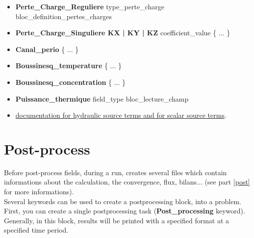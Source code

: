 \begin{itemize}
\item \textbf{Perte\_Charge\_Reguliere} type\_perte\_charge bloc\_definition\_pertes\_charges
\item \textbf{Perte\_Charge\_Singuliere KX | KY | KZ } coefficient\_value \{ ... \} 
\item \textbf{Canal\_perio} \{ ... \} 
\item \textbf{Boussinesq\_temperature} \{ ... \}
\item \textbf{Boussinesq\_concentration} \{ ... \}
\item \textbf{Puissance\_thermique} field\_type   bloc\_lecture\_champ 
\item \href{TRUST_Reference_Manual.pdf\#sourcebase}{documentation for hydraulic source terms and for scalar source terms}.
\end{itemize}





\section{Post-process}

Before post-process fields, during a run, \trust creates several files which contain informations about the calculation, the convergence, flux, bilans... (see part \ref{post} for more informations).\\

Several keywords can be used to create a postprocessing block, into a problem. First, you can create a single postprocessing task (\textbf{Post\_processing} keyword). Generally, in this block, results will be printed with a specified format at a specified time period.

    \begin{center}
    \end{center}

